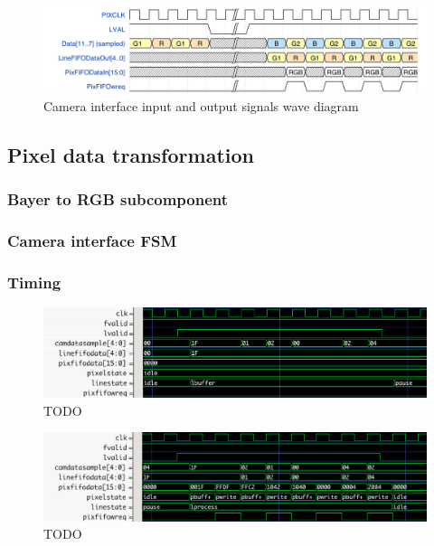 \documentclass{article}
\begin{document}
\begin{figure}[H]
\centering
\includegraphics[width=\textwidth]{images/camera_interface_data_signals.png}
\caption{Camera interface input and output signals wave diagram}
\label{fig:camera_interface_signals}
\end{figure}

\subsection{Pixel data transformation}

\subsubsection{Bayer to RGB subcomponent}

\subsubsection{Camera interface FSM}

\subsubsection{Timing}

\begin{figure}[H]
\centering
\includegraphics[width=\textwidth]{images/cam_interface_sim_lbuffer.png}
\caption{TODO}
\label{fig:sim_lbuffer}
\end{figure}

\begin{figure}[H]
\centering
\includegraphics[width=\textwidth]{images/cam_interface_sim_lprocess.png}
\caption{TODO}
\label{fig:sim_lprocess}
\end{figure}
\end{document}
